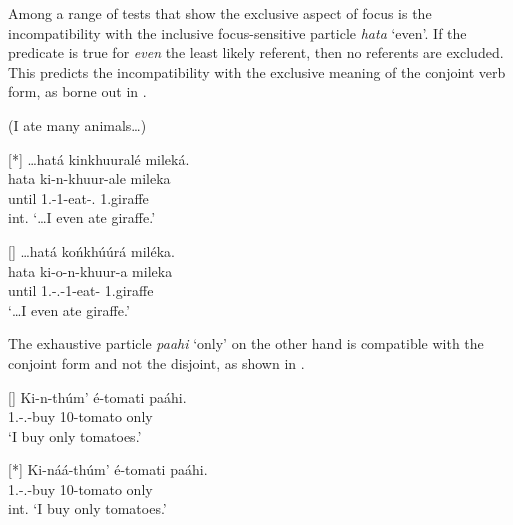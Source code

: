 \documentclass[output=paper]{langscibook}
\begin{document}
Among a range of tests that show the exclusive aspect of focus is the incompatibility with the inclusive focus-sensitive particle \textit{hata} ‘even’. If the predicate is true for \textit{even} the least likely referent, then no referents are excluded. This predicts the incompatibility with the exclusive meaning of the conjoint verb form, as borne out in .

\ea
\label{bkm:Ref95490991}
(I ate many animals…)
\begin{xlist}
\exi{\CJ}
[*]{
…hatá kinkhuuralé mileká.\\
\gll
hata  ki-n-khuur-ale  mileka\\
until  1\SG{}.\SM{}-1\OM{}-eat-\PFV{}.\CJ{}  1.giraffe\\
\glt
int. ‘…I even ate giraffe.’\\
}

\exi{\DJ}
[]{
…hatá końkhúúrá miléka.\\
\gll
hata  ki-o-n-khuur-a  mileka\\
until  1\SG{}.\SM{}-\PFV{}.\DJ{}-1\OM{}-eat-\FV{}  1.giraffe\\
\glt
‘…I even ate giraffe.’
}

\end{xlist}
\z


The exhaustive particle \textit{paahi} ‘only’ on the other hand is compatible with the conjoint form and not the disjoint, as shown in .

\ea
\label{bkm:Ref105317933}
\begin{xlist}
\exi{\CJ{}}
[]{
\gll
Ki-n-thúm’  é-tomati  paáhi.\\
1\SG{}.\SM{}-\PRS{}.\CJ{}-{}buy  10-tomato  only\\
\glt
‘I buy only tomatoes.’\\
}

\exi{\DJ}
[*]{
\gll
Ki{}-náá{}-thúm’  é-tomati  paáhi.\\
1\SG.\SM-\PRS.\DJ{}-buy  10-tomato  only\\
\glt
int. ‘I buy only tomatoes.’ \citep[1739]{vanderWal2011}
}

\end{xlist}
\end{document}
